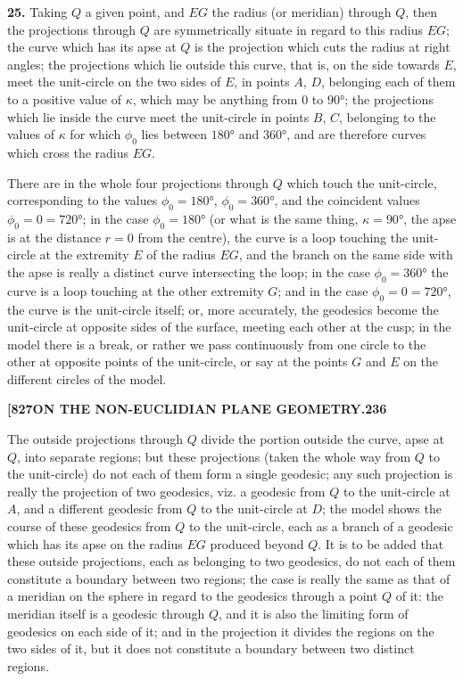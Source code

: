 \documentclass[11pt,a4paper]{book}
\begin{document}
\noindent\textbf{25.} Taking $Q$ a given point, and $EG$ the radius (or meridian) through $Q$, then the projections through $Q$ are symmetrically situate in regard to this radius $EG$; the curve which has its apse at $Q$ is the projection which cuts the radius at right angles; the projections which lie outside this curve, that is, on the side towards $E$, meet the unit-circle on the two sides of $E$, in points $A$, $D$, belonging each of them to a positive value of $\kappa$, which may be anything from $0$ to $90°$; the projections which lie inside the curve meet the unit-circle in points $B$, $C$, belonging to the values of $\kappa$ for which $\phi_0$ lies between $180°$ and $360°$, and are therefore curves which cross the radius $EG$.

There are in the whole four projections through $Q$ which touch the unit-circle, corresponding to the values $\phi_0 = 180°$, $\phi_0 = 360°$, and the coincident values $\phi_0 = 0 = 720°$; in the case $\phi_0 = 180°$ (or what is the same thing, $\kappa = 90°$, the apse is at the distance $r = 0$ from the centre), the curve is a loop touching the unit-circle at the extremity $E$ of the radius $EG$, and the branch on the same side with the apse is really a distinct curve intersecting the loop; in the case $\phi_0 = 360°$ the curve is a loop touching at the other extremity $G$; and in the case $\phi_0 = 0 = 720°$, the curve is the unit-circle itself; or, more accurately, the geodesics become the unit-circle at opposite sides of the surface, meeting each other at the cusp; in the model there is a break, or rather we pass continuously from one circle to the other at opposite points of the unit-circle, or say at the points $G$ and $E$ on the different circles of the model.

\newpage
\setcounter{page}{236}

\noindent\textbf{[827}\hfill\textbf{ON THE NON-EUCLIDIAN PLANE GEOMETRY.}\hfill\textbf{236}

\bigskip

\noindent The outside projections through $Q$ divide the portion outside the curve, apse at $Q$, into separate regions; but these projections (taken the whole way from $Q$ to the unit-circle) do not each of them form a single geodesic; any such projection is really the projection of two geodesics, viz. a geodesic from $Q$ to the unit-circle at $A$, and a different geodesic from $Q$ to the unit-circle at $D$; the model shows the course of these geodesics from $Q$ to the unit-circle, each as a branch of a geodesic which has its apse on the radius $EG$ produced beyond $Q$. It is to be added that these outside projections, each as belonging to two geodesics, do not each of them constitute a boundary between two regions; the case is really the same as that of a meridian on the sphere in regard to the geodesics through a point $Q$ of it: the meridian itself is a geodesic through $Q$, and it is also the limiting form of geodesics on each side of it; and in the projection it divides the regions on the two sides of it, but it does not constitute a boundary between two distinct regions.
\end{document}

